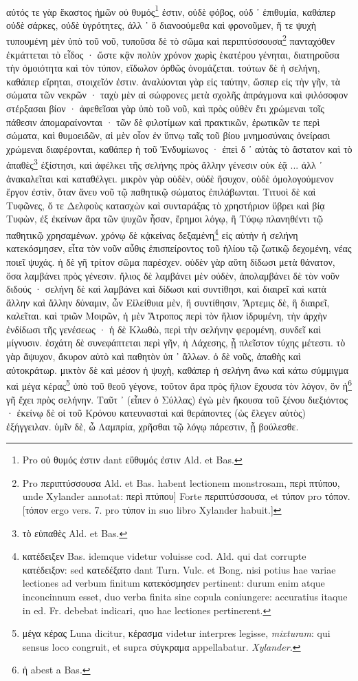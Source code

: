 \documentclass[a4paper, 11pt, oneside, polutonikogreek, german]{article}
\begin{document}
\paragraph{}
αὐτός τε γὰρ ἕκαστος ἡμῶν οὐ θυμός\footnote{Pro οὐ θυμός ἐστιν dant εὒθυμός ἐστιν Ald. et Bas.} ἐστιν, οὐδὲ φόβος, οὐδ ᾽ ἐπιθυμία, καθάπερ οὐδὲ σάρκες, οὐδὲ ὑγρότητες, ἀλλ ᾽ ὃ διανοούμεθα καὶ φρονοῦμεν, ἥ τε ψυχὴ τυπουμένη μὲν ὑπὸ τοῦ νοῦ, τυποῦσα δὲ τὸ σῶμα καὶ περιπτύσσουσα\footnote{Pro περιπτύσσουσα Ald. et Bas. habent lectionem monstrosam, περὶ πτύπου, unde Xylander annotat: περὶ πτύπου] Forte περιπτύσσουσα, et τύπον pro τόπον. [τόπον ergo vers. 7. pro τύπον in suo libro Xylander habuit.]} πανταχόθεν ἐκμάττεται τὸ εἶδος · ὥστε κᾂν πολὺν χρόνον χωρὶς ἑκατέρου γένηται, διατηροῦσα τὴν ὁμοιότητα καὶ τὸν τύπον, εἴδωλον ὀρθῶς ὀνομάζεται. τούτων δὲ ἡ σελήνη, καθάπερ εἴρηται, στοιχεῖόν ἐστιν. ἀναλύονται γὰρ εἰς ταύτην, ὥσπερ εἰς τὴν γῆν, τὰ σώματα τῶν νεκρῶν · ταχὺ μὲν αἱ σώφρονες μετὰ σχολῆς ἀπράγμονα καὶ φιλόσοφον στέρξασαι βίον · ἀφεθεῖσαι γὰρ ὑπὸ τοῦ νοῦ, καὶ πρὸς οὐθὲν ἔτι χρώμεναι τοῖς πάθεσιν ἀπομαραίνονται · τῶν δὲ φιλοτίμων καὶ πρακτικῶν, ἐρωτικῶν τε περὶ σώματα, καὶ θυμοειδῶν, αἱ μὲν οἷον ἐν ὕπνῳ ταῖς τοῦ βίου μνημοσύναις ὀνείρασι χρώμεναι διαφέρονται, καθάπερ ἡ τοῦ Ἐνδυμίωνος · ἐπεὶ δ ᾽ αὐτὰς τὸ ἄστατον καὶ τὸ ἀπαθὲς\footnote{τὸ εὐπαθὲς Ald. et Bas.} ἐξίστησι, καὶ ἀφέλκει τῆς σελήνης πρὸς ἄλλην γένεσιν οὐκ ἐᾷ ... ἀλλ ᾽ ἀνακαλεῖται καὶ καταθέλγει. μικρὸν γὰρ οὐδὲν, οὐδὲ ἥσυχον, οὐδὲ ὁμολογούμενον ἔργον ἐστὶν, ὅταν ἄνευ νοῦ τῷ παθητικῷ σώματος ἐπιλάβωνται. Τιτυοὶ δὲ καὶ Τυφῶνες, ὅ τε Δελφοὺς κατασχὼν καὶ συνταράξας τὸ χρηστήριον ὕβρει καὶ βίᾳ Τυφὼν, ἐξ ἐκείνων ἄρα τῶν ψυχῶν ἦσαν, ἔρημοι λόγῳ, ἢ Τύφῳ πλανηθέντι τῷ παθητικῷ χρησαμένων. χρόνῳ δὲ κᾀκείνας δεξαμένη\footnote{κατέδειξεν Bas. idemque videtur voluisse cod. Ald. qui dat corrupte κατέδειξον: sed κατεδέξατο dant Turn. Vulc. et Bong. nisi potius hae variae lectiones ad verbum finitum κατεκόσμησεν pertinent: durum enim atque inconcinnum esset, duo verba finita sine copula coniungere: accuratius itaque in ed. Fr. debebat indicari, quo hae lectiones pertinerent.} εἰς αὐτὴν ἡ σελήνη κατεκόσμησεν, εἶτα τὸν νοῦν αὖθις ἐπισπείροντος τοῦ ἡλίου τῷ ζωτικῷ δεχομένη, νέας ποιεῖ ψυχάς. ἡ δὲ γῆ τρίτον σῶμα παρέσχεν. οὐδὲν γὰρ αὕτη δίδωσι μετὰ θάνατον, ὅσα λαμβάνει πρὸς γένεσιν. ἥλιος δὲ λαμβάνει μὲν οὐδὲν, ἀπολαμβάνει δὲ τὸν νοῦν διδούς · σελήνη δὲ καὶ λαμβάνει καὶ δίδωσι καὶ συντίθησι, καὶ διαιρεῖ καὶ κατὰ ἄλλην καὶ ἄλλην δύναμιν, ὧν Εἰλείθυια μὲν, ἣ συντίθησιν, Ἄρτεμις δὲ, ἣ διαιρεῖ, καλεῖται. καὶ τριῶν Μοιρῶν, ἡ μὲν Ἄτροπος περὶ τὸν ἥλιον ἱδρυμένη, τὴν ἀρχὴν ἐνδίδωσι τῆς γενέσεως · ἡ δὲ Κλωθὼ, περὶ τὴν σελήνην φερομένη, συνδεῖ καὶ μίγνυσιν. ἐσχάτη δὲ συνεφάπτεται περὶ γῆν, ἡ Λάχεσης, ᾗ πλεῖστον τύχης μέτεστι. τὸ γὰρ ἄψυχον, ἄκυρον αὐτὸ καὶ παθητὸν ὑπ ᾽ ἄλλων. ὁ δὲ νοῦς, ἀπαθὴς καὶ αὐτοκράτωρ. μικτὸν δὲ καὶ μέσον ἡ ψυχὴ, καθάπερ ἡ σελήνη ἄνω καὶ κάτω σύμμιγμα καὶ μέγα κέρας\footnote{μέγα κέρας Luna dicitur, κέρασμα videtur interpres legisse, \emph{mixturam}: qui sensus loco congruit, et supra σύγκραμα appellabatur. \emph{Xylander.}} ὑπὸ τοῦ θεοῦ γέγονε, τοῦτον ἄρα πρὸς ἥλιον ἔχουσα τὸν λόγον, ὃν ἡ\footnote{ἡ abest a Bas.} γῆ ἔχει πρὸς σελήνην. Ταῦτ ᾽ (εἶπεν ὁ Σύλλας) ἐγὼ μὲν ἤκουσα τοῦ ξένου διεξιόντος · ἐκείνῳ δὲ οἱ τοῦ Κρόνου κατευνασταὶ καὶ θεράποντες (ὡς ἔλεγεν αὐτὸς) ἐξήγγειλαν. ὑμῖν δὲ, ὦ Λαμπρία, χρῆσθαι τῷ λόγῳ πάρεστιν, ᾗ βούλεσθε.
\clearpage
\end{document}
